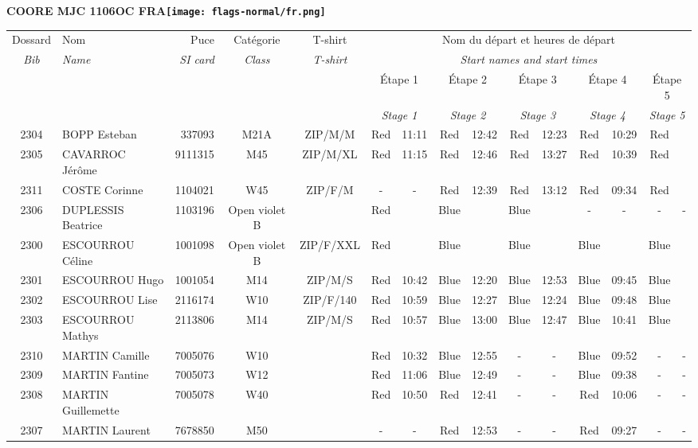 \documentclass{report}
\begin{document}
\newpage
  \Huge \centering \bfseries COORE MJC 1106OC FRA\normalfont \footnotesize \sffamily \hfill \texttt{[image: flags-normal/fr.png]} \newline 
  \begin{longtable}{|c|l|r|c|c|*{5}{cc|}}
    Dossard & Nom  & Puce    & Catégorie & T-shirt & \multicolumn{10}{c|}{Nom du départ et heures de départ} \\
    \itshape Bib     & \itshape Name & \itshape SI card & \itshape Class  & \itshape  T-shirt  & \multicolumn{10}{c|}{\itshape Start names and start times} \\
    \hline
    & & & & & \multicolumn{2}{c|}{Étape 1} & \multicolumn{2}{c|}{Étape 2} & \multicolumn{2}{c|}{Étape 3} & \multicolumn{2}{c|}{Étape 4} & \multicolumn{2}{c|}{Étape 5} \\
    & & & & & \multicolumn{2}{c|}{\itshape Stage 1} & \multicolumn{2}{c|}{\itshape Stage 2} & \multicolumn{2}{c|}{\itshape Stage 3} & \multicolumn{2}{c|}{\itshape Stage 4} & \multicolumn{2}{c|}{\itshape Stage 5} \\
    \hline
    2304 & BOPP Esteban & 337093 & M21A & ZIP/M/M & Red & 11:11 & Red & 12:42 & Red & 12:23 & Red & 10:29 & Red &  \\
    2305 & CAVARROC Jérôme & 9111315 & M45 & ZIP/M/XL & Red & 11:15 & Red & 12:46 & Red & 13:27 & Red & 10:39 & Red &  \\
    2311 & COSTE Corinne & 1104021 & W45 & ZIP/F/M & - &  - & Red & 12:39 & Red & 13:12 & Red & 09:34 & Red &  \\
    2306 & DUPLESSIS Beatrice & 1103196 & Open violet B &   & Red &   & Blue &   & Blue &   & - &  - & - &  -\\
    2300 & ESCOURROU Céline & 1001098 & Open violet B & ZIP/F/XXL & Red &   & Blue &   & Blue &   & Blue &   & Blue &  \\
    2301 & ESCOURROU Hugo & 1001054 & M14 & ZIP/M/S & Red & 10:42 & Blue & 12:20 & Blue & 12:53 & Blue & 09:45 & Blue &  \\
    2302 & ESCOURROU Lise & 2116174 & W10 & ZIP/F/140 & Red & 10:59 & Blue & 12:27 & Blue & 12:24 & Blue & 09:48 & Blue &  \\
    2303 & ESCOURROU Mathys & 2113806 & M14 & ZIP/M/S & Red & 10:57 & Blue & 13:00 & Blue & 12:47 & Blue & 10:41 & Blue &  \\
    2310 & MARTIN Camille & 7005076 & W10 &   & Red & 10:32 & Blue & 12:55 & - &  - & Blue & 09:52 & - &  -\\
    2309 & MARTIN Fantine & 7005073 & W12 &   & Red & 11:06 & Blue & 12:49 & - &  - & Blue & 09:38 & - &  -\\
    2308 & MARTIN Guillemette & 7005078 & W40 &   & Red & 10:50 & Red & 12:41 & - &  - & Red & 10:06 & - &  -\\
    2307 & MARTIN Laurent & 7678850 & M50 &   & - &  - & Red & 12:53 & - &  - & Red & 09:27 & - &  -\\
  \end{longtable}
\end{document}

